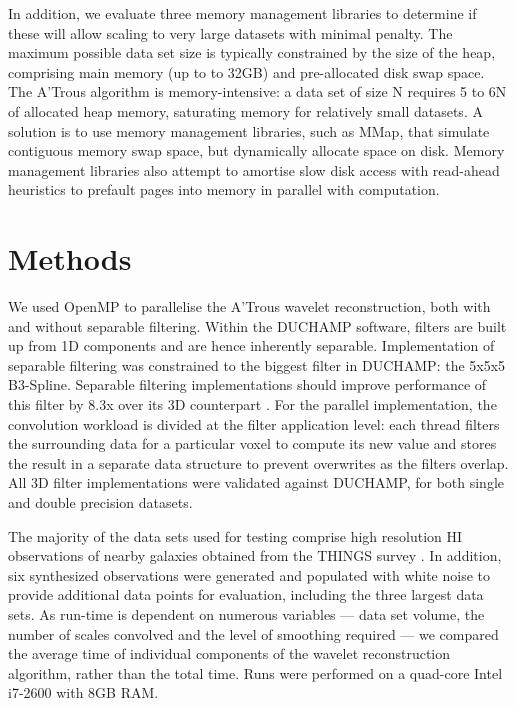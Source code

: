 In addition, we evaluate three memory management libraries to determine if these will allow scaling to very large datasets with minimal penalty. The maximum possible data set size is typically constrained by the size of the heap, comprising main memory (up to to 32GB) and pre-allocated disk swap space.  The A'Trous algorithm is memory-intensive: a data set of size N requires 5 to 6N of allocated heap memory, saturating memory for relatively small datasets. A solution  is to use memory management libraries, such as MMap\citep{mmap2012}, that simulate contiguous memory swap space, but dynamically allocate space on disk. Memory management libraries also attempt to amortise slow disk access with read-ahead heuristics to prefault pages into memory in parallel with computation.

\section{Methods}

We used OpenMP to parallelise the  A'Trous wavelet reconstruction, both with and without separable filtering.  Within the DUCHAMP software, filters are built up from 1D components and are hence inherently separable.  Implementation of separable filtering was constrained to the biggest filter in DUCHAMP: the  5x5x5 B3-Spline. Separable filtering implementations should  improve performance of this filter by 8.3x over its 3D counterpart \citep{Solomon2010}. For the parallel implementation, the convolution workload is divided at the filter application level: each  thread filters the surrounding data for a particular voxel to compute its new value and stores the result in a separate data structure to prevent overwrites as the filters overlap.  All  3D filter implementations were validated against  DUCHAMP, for both single and double precision datasets.

The majority of the data sets used for testing comprise high resolution HI observations of nearby galaxies obtained from the THINGS survey \citep{Walter2008}. In addition, six synthesized observations were generated and populated with white noise to provide additional data points for evaluation, including the three largest data sets. As run-time is dependent on numerous variables ---  data set volume, the number of scales convolved  and the level of smoothing required --- we compared the average time of  individual components of the wavelet reconstruction algorithm, rather than the total time.  Runs were performed on a quad-core Intel i7-2600 with 8GB RAM.

